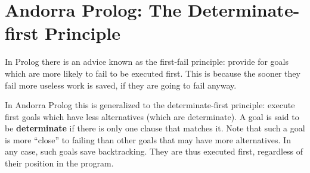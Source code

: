 
\section{Andorra Prolog: The Determinate-first Principle}

In Prolog there is an advice known as the first-fail principle:
provide for goals which are more likely to fail to be executed
first. This is because the sooner they fail more useless work is
saved, if they are going to fail anyway.

In Andorra Prolog this is generalized to the determinate-first
principle: execute first goals which have less alternatives (which are
determinate). A goal is said to be {\bf determinate} if there is only
one clause that matches it. Note that such a goal is more ``close'' to
failing than other goals that may have more alternatives. In any case,
such goals save backtracking. They are thus executed first, regardless
of their position in the program.
